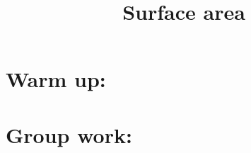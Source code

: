 \documentclass[]{ximera}
\title{Surface area}
\begin{document}
\begin{abstract}		\end{abstract}
\maketitle



\section{Warm up:}

	\begin{freeResponse}
	
	\end{freeResponse}
	
\begin{instructorNotes}

\end{instructorNotes}







\section{Group work:}
\end{document}
